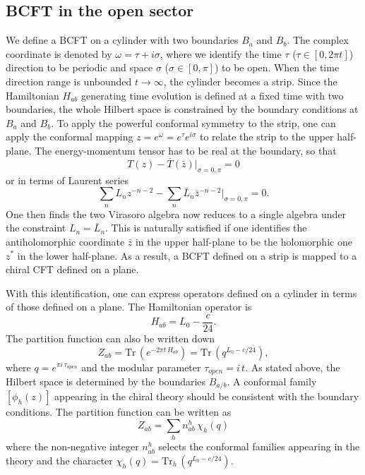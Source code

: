 \documentclass[submission, PhysLectNotes]{SciPost}
\begin{document}
\subsection{BCFT in the open sector}
We define a BCFT on a cylinder with two boundaries $B_a$ and $B_b$. The complex coordinate is denoted by $\omega = \tau + i \sigma$, where we identify the time $\tau$ ($\tau \in [0,2\pi t]$) direction to be periodic and space $\sigma$ ($\sigma \in [0,\pi]$) to be open. When the time direction range is unbounded $t\rightarrow\infty$, the cylinder becomes a strip. Since the Hamiltonian $H_{ab}$ generating time evolution is defined at a fixed time with two boundaries, the whole Hilbert space is constrained by the boundary conditions at $B_a$ and $B_b$. To apply the powerful conformal symmetry to the strip, one can apply the conformal mapping $z = e^\omega = e^\tau e^{i\sigma}$ to relate the strip to the upper half-plane. The energy-momentum tensor has to be real at the boundary, so that
\begin{equation} \label{Eq_T_open}
    T(z) - \bar{T}(\bar{z})\vert_{\sigma=0,\pi} = 0
\end{equation}
or in terms of Laurent series 
\begin{equation}
    \sum_n L_n z^{-n-2} - \sum_n \bar{L}_n \bar{z}^{-n-2}\vert_{\sigma=0,\pi} = 0. 
\end{equation}
One then finds the two Virasoro algebra now reduces to a single algebra under the constraint $L_n = \bar{L}_n$. This is naturally satisfied if one identifies the antiholomorphic coordinate $\bar{z}$ in the upper half-plane to be the holomorphic one $z^*$ in the lower half-plane. As a result, a BCFT defined on a strip is mapped to a chiral CFT defined on a plane. 

With this identification, one can express operators defined on a cylinder in terms of those defined on a plane. The Hamiltonian operator is 
\begin{equation}
    H_{ab} = L_0 - \frac{c}{24}. 
\end{equation}
The partition function can also be written down 
\begin{equation}
    Z_{ab} = \mathrm{Tr}\,\left( e^{-2\pi t\, H_{ab}}\right) = \mathrm{Tr}\,\left( q^{L_0-c/24}\right),
\end{equation}
where $q=e^{\pi i\, \tau_{open}}$ and the modular parameter $\tau_{open} = i\,t$. As stated above, the Hilbert space is determined by the boundaries $B_{a/b}$. A conformal family $[\phi_{h}(z)]$ appearing in the chiral theory should be consistent with the boundary conditions. The partition function can be written as 
\begin{equation}
    Z_{ab} = \sum_h n_{ab}^h\, \chi_h(q)
\end{equation}
where the non-negative integer $n_{ab}^h$ selects the conformal families appearing in the theory and the character $\chi_h(q) = \mathrm{Tr}_h\,\left( q^{L_0-c/24}\right)$.
\end{document}
